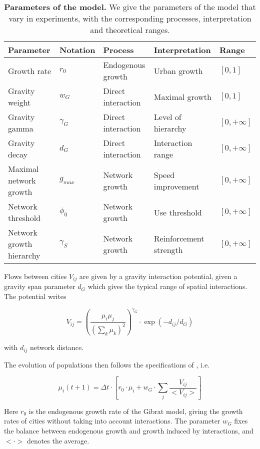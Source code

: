 \documentclass[11pt]{article}
\begin{document}
\begin{table}
\caption{\textbf{Parameters of the model.} We give the parameters of the model that vary in experiments, with the corresponding processes, interpretation and theoretical ranges.\label{tab:parameters}}	
\begin{tabular}{|l|l|l|l|l|}
\hline
Parameter & Notation & Process & Interpretation & Range\\
\hline
Growth rate & $r_0$ & Endogenous growth & Urban growth & $\left[ 0,1\right]$ \\
Gravity weight & $w_G$ & Direct interaction & Maximal growth & $\left[ 0,1\right]$ \\
Gravity gamma & $\gamma_G$ & Direct interaction & Level of hierarchy & $\left[ 0,+\infty\right]$ \\
Gravity decay & $d_G$ & Direct interaction & Interaction range & $\left[ 0,+\infty\right]$ \\
Maximal network growth & $g_{max}$ & Network growth & Speed improvement & $\left[ 0,+\infty\right]$ \\
Network threshold & $\phi_0$ & Network growth & Use threshold & $\left[ 0,+\infty\right]$ \\
Network growth hierarchy & $\gamma_S$ & Network growth & Reinforcement strength & $\left[ 0,+\infty\right]$ \\
\hline
\end{tabular}
\end{table}


Flows between cities $V_{ij}$ are given by a gravity interaction potential, given a gravity span parameter $d_G$ which gives the typical range of spatial interactions. The potential writes

\begin{equation}
\label{eq:gravity}
V_{ij} = \left(\frac{\mu_i\mu_j}{\left(\sum_k{\mu_k}\right)^2}\right)^{\gamma_G}\cdot \exp{\left(-d_{ij}/d_G\right)}
\end{equation}

with $d_{ij}$ network distance.


The evolution of populations then follows the specifications of \cite{raimbault2018indirect}, i.e.

\begin{equation}
\label{eq:genspec}
\mu_i(t+1)=\Delta t\cdot \left[ r_0\cdot \mu_i + w_G\cdot \sum_j \frac{V_{ij}}{<V_{ij}>}\right]
\end{equation}

Here $r_0$ is the endogenous growth rate of the Gibrat model, giving the growth rates of cities without taking into account interactions. The parameter $w_G$ fixes the balance between endogenous growth and growth induced by interactions, and $< \cdot >$ denotes the average.
\end{document}
